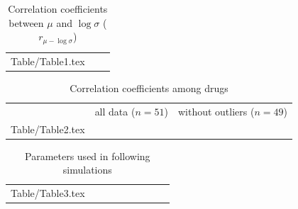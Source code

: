 \documentclass[a4paper,11pt]{article}
\makeatletter
\newcommand*\ExpandableInput[1]{\@@input#1 }
\makeatother
\begin{document}
\clearpage


\begin{table}[htbp]
 \caption{Correlation coefficients between $\mu$ and $\log \sigma$ ($r_{\mu - \log \sigma}$)}
 \label{tbl1}
 \small
 \vspace{1ex}
 \centering
 \begin{tabular}{ccc}
  \toprule
  \ExpandableInput{Table/Table1.tex}
 \end{tabular}
\end{table}


\begin{table}[htbp]
 \caption{Correlation coefficients among drugs}
 \label{tbl2}
 \small
 \vspace{1ex}
 \centering
 \begin{tabular}{ccccc}
  \toprule
   & \multicolumn{2}{c}{all data ($n = 51$)}
   & \multicolumn{2}{c}{without outliers ($n = 49$)} \\
  \cmidrule(lr){2-3}
  \cmidrule(lr){4-5}
  \ExpandableInput{Table/Table2.tex}
 \end{tabular}
\end{table}



\begin{table}[htbp]
 \caption{Parameters used in following simulations}
 \label{tbl3}
 \small
 \vspace{1ex}
 \centering
 \begin{tabular}{ccccccccc}
  \toprule
  \ExpandableInput{Table/Table3.tex}
 \end{tabular}
\end{table}

\clearpage
\end{document}
